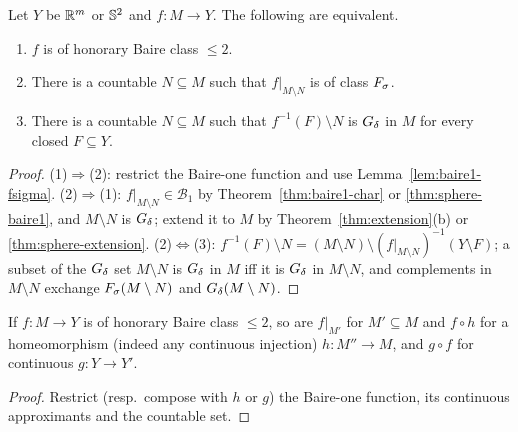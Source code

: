 \begin{theorem}\label{thm:honorary-char}
Let $Y$ be $\mathbb{R}^m$ or $\mathbb{S}^2$ and $f:M\to Y$. The following are equivalent.
\begin{enumerate}[label=(\arabic*)]
\item $f$ is of honorary Baire class $\le2$.
\item There is a countable $N\subseteq M$ such that $f|_{M\setminus N}$ is of class $F_\sigma$.
\item There is a countable $N\subseteq M$ such that $f^{-1}(F)\setminus N$ is $G_\delta$ in $M$ for every
  closed $F\subseteq Y$.
\end{enumerate}
\end{theorem}
\begin{proof}
(1)$\Rightarrow$(2): restrict the Baire-one function and use Lemma~\ref{lem:baire1-fsigma}.
(2)$\Rightarrow$(1): $f|_{M\setminus N}\in\mathcal B_1$ by Theorem~\ref{thm:baire1-char} or
\ref{thm:sphere-baire1}, and $M\setminus N$ is $G_\delta$; extend it to $M$ by
Theorem~\ref{thm:extension}(b) or \ref{thm:sphere-extension}.
(2)$\Leftrightarrow$(3): $f^{-1}(F)\setminus N=(M\setminus N)\setminus(f|_{M\setminus N})^{-1}(Y\setminus F)$;
a subset of the $G_\delta$ set $M\setminus N$ is $G_\delta$ in $M$ iff it is $G_\delta$ in $M\setminus N$, and complements
in $M\setminus N$ exchange $F_\sigma(M\setminus N)$ and $G_\delta(M\setminus N)$.
\end{proof}

\begin{lemma}\label{lem:honorary-invariance}
If $f:M\to Y$ is of honorary Baire class $\le2$, so are $f|_{M'}$ for $M'\subseteq M$ and $f\circ h$ for a
homeomorphism (indeed any continuous injection) $h:M''\to M$, and $g\circ f$ for continuous $g:Y\to Y'$.
\end{lemma}
\begin{proof}
Restrict (resp.\ compose with $h$ or $g$) the Baire-one function, its continuous approximants and the countable set.
\end{proof}

